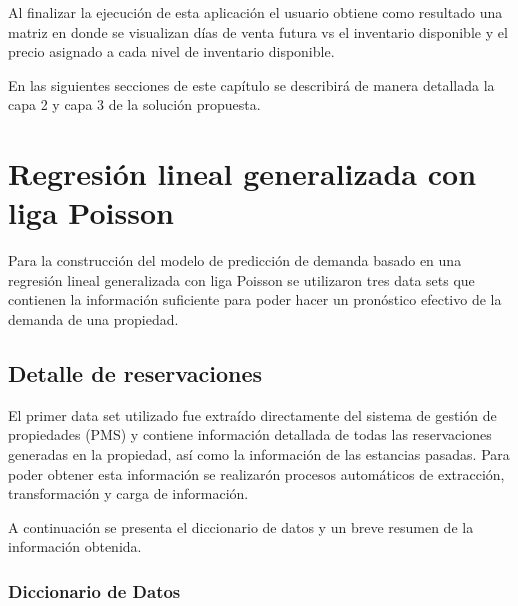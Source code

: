 Al finalizar la ejecución de esta aplicación el usuario obtiene como resultado una matriz en donde se visualizan días de venta futura vs el inventario disponible y el precio asignado a cada nivel de inventario disponible. 

En las siguientes secciones de este capítulo se describirá de manera detallada la capa 2 y capa 3 de la solución propuesta.

\section*{Regresión lineal generalizada con liga Poisson}

Para la construcción del modelo de predicción de demanda basado en una regresión lineal generalizada con liga Poisson se utilizaron tres data sets que contienen la información suficiente para poder hacer un pronóstico efectivo de la demanda de una propiedad.

\subsection*{Detalle de reservaciones}


El primer data set utilizado fue extraído directamente del sistema de gestión de propiedades (PMS) y contiene información detallada de todas las reservaciones generadas en la propiedad, así como la información de las estancias pasadas. Para poder obtener esta información se realizarón procesos automáticos de extracción, transformación y carga de información. 

A continuación se presenta el diccionario de datos y un breve resumen de la información obtenida.

\subsubsection*{Diccionario de Datos}


